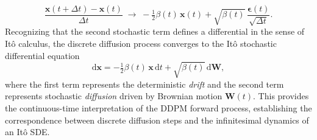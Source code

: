 \[
\frac{\mathbf{x}(t+\Delta t) - \mathbf{x}(t)}{\Delta t}
\;\longrightarrow\;
-\tfrac{1}{2}\beta(t)\,\mathbf{x}(t)
+ \sqrt{\beta(t)}\,\frac{\boldsymbol{\epsilon}(t)}{\sqrt{\Delta t}}.
\]
Recognizing that the second stochastic term defines a differential in the sense of Itô calculus, the discrete diffusion process converges to the Itô stochastic differential equation
\[
\boxed{
\mathrm{d}\mathbf{x} = -\tfrac{1}{2}\beta(t)\,\mathbf{x}\,\mathrm{d}t + \sqrt{\beta(t)}\,\mathrm{d}\mathbf{W},
}
\]
where the first term represents the deterministic \emph{drift} and the second term represents stochastic \emph{diffusion} driven by Brownian motion \(\mathbf{W}(t)\).
This provides the continuous-time interpretation of the DDPM forward process, establishing the correspondence between discrete diffusion steps and the infinitesimal dynamics of an Itô SDE.